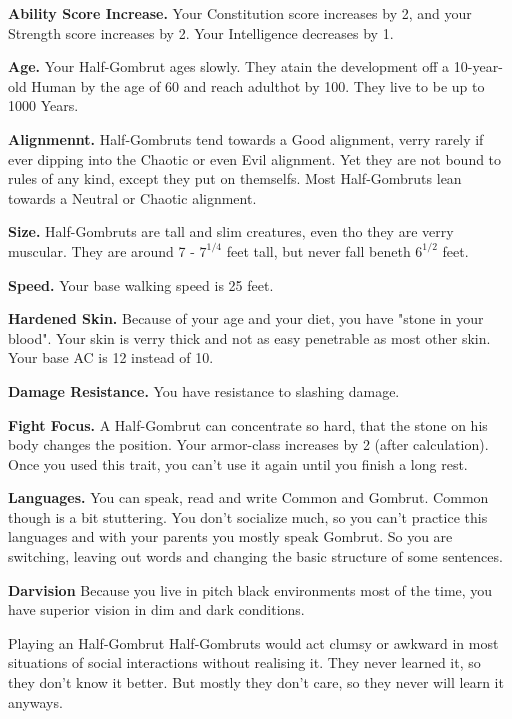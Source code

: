 \textbf{Ability Score Increase.} Your Constitution score increases by 2, and your Strength score increases by 2. Your Intelligence decreases by 1.

\textbf{Age.} Your Half-Gombrut ages slowly. They atain the development off a 10-year-old Human by the age of 60 and reach adulthot by 100. They live to be up to 1000 Years.

\textbf{Alignmennt.} Half-Gombruts tend towards a Good alignment, verry rarely if ever dipping into the Chaotic or even Evil alignment. Yet they are not bound to rules of any kind, except they put on themselfs. Most Half-Gombruts lean towards a Neutral or Chaotic alignment.

\textbf{Size.} Half-Gombruts are tall and slim creatures, even tho they are verry muscular. They are around 7 - $7^{1/4}$ feet tall, but never fall beneth $6^{1/2}$ feet.

\textbf{Speed.} Your base walking speed is 25 feet.

\textbf{Hardened Skin.} Because of your age and your diet, you have "stone in your blood". Your skin is verry thick and not as easy penetrable as most other skin. Your base AC is 12 instead of 10.

\textbf{Damage Resistance.} You have resistance to slashing damage.

\textbf{Fight Focus.} A Half-Gombrut can concentrate so hard, that the stone on his body changes the position. Your armor-class increases by 2 (after calculation). Once you used this trait, you can't use it again until you finish a long rest.

\textbf{Languages.} You can speak, read and write Common and Gombrut. Common though is a bit stuttering. You don't socialize much, so you can't practice this languages and with your parents you mostly speak Gombrut. So you are switching, leaving out words and changing the basic structure of some sentences.

\textbf{Darvision} Because you live in pitch black environments most of the time, you have superior vision in dim and dark conditions. 

\begin{commentbox}{Playing an Half-Gombrut}
Half-Gombruts would act clumsy or awkward in most situations of social interactions without realising it. They never learned it, so they don't know it better. But mostly they don't care, so they never will learn it anyways.
\end{commentbox}

